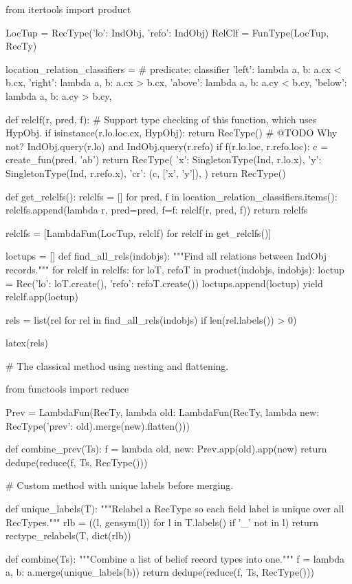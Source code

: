 \begin{cell}
from itertools import product

LocTup = RecType({'lo': IndObj, 'refo': IndObj})
RelClf = FunType(LocTup, RecTy)

location_relation_classifiers = {
    # predicate: classifier
    'left': lambda a, b: a.cx < b.cx,
    'right': lambda a, b: a.cx > b.cx,
    'above': lambda a, b: a.cy < b.cy,
    'below': lambda a, b: a.cy > b.cy,
}

def relclf(r, pred, f):
    # Support type checking of this function, which uses HypObj.
    if isinstance(r.lo.loc.cx, HypObj):
        return RecType()
    # @TODO Why not? IndObj.query(r.lo) and IndObj.query(r.refo)
    if f(r.lo.loc, r.refo.loc):
        c = create_fun(pred, 'ab')
        return RecType({
            'x': SingletonType(Ind, r.lo.x),
            'y': SingletonType(Ind, r.refo.x),
            'cr': (c, ['x', 'y']),
        })
    return RecType()

def get_relclfs():
    relclfs = []
    for pred, f in location_relation_classifiers.items():
        relclfs.append(lambda r, pred=pred, f=f: relclf(r, pred, f))
    return relclfs

relclfs = [LambdaFun(LocTup, relclf) for relclf in get_relclfs()]

loctups = []
def find_all_rels(indobjs):
    """Find all relations between IndObj records."""
    for relclf in relclfs:
        for loT, refoT in product(indobjs, indobjs):
            loctup = Rec({'lo': loT.create(), 'refo': refoT.create()})
            loctups.append(loctup)
            yield relclf.app(loctup)
        
rels = list(rel for rel in find_all_rels(indobjs) if len(rel.labels()) > 0)

latex(rels)
\end{cell}

\begin{cell}
# The classical method using nesting and flattening.

from functools import reduce

Prev = LambdaFun(RecTy, lambda old:
         LambdaFun(RecTy, lambda new:
           RecType({'prev': old}).merge(new).flatten()))

def combine_prev(Ts):
    f = lambda old, new: Prev.app(old).app(new)
    return dedupe(reduce(f, Ts, RecType()))
\end{cell}

\begin{cell}
# Custom method with unique labels before merging.

def unique_labels(T):
    """Relabel a RecType so each field label is unique over all RecTypes."""
    rlb = ((l, gensym(l)) for l in T.labels() if '_' not in l)
    return rectype_relabels(T, dict(rlb))

def combine(Ts):
    """Combine a list of belief record types into one."""
    f = lambda a, b: a.merge(unique_labels(b))
    return dedupe(reduce(f, Ts, RecType()))
\end{cell}

